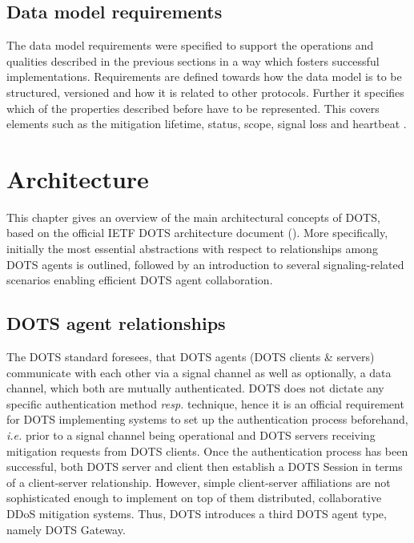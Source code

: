 \subsection{Data model requirements}
The data model requirements were specified to support the operations and qualities described in the previous sections in a way which fosters successful implementations.
Requirements are defined towards how the data model is to be structured, versioned and how it is related to other protocols. Further it specifies which of the properties described before have to be represented. This covers elements such as the mitigation lifetime, status, scope, signal loss and heartbeat \cite{rfc8612}.

\section{Architecture}


This chapter gives an overview of the main architectural concepts of DOTS, based on the official IETF DOTS architecture document (\cite{dots-architecture}). More specifically, initially the most essential abstractions with respect to relationships among DOTS agents is outlined, followed by an introduction to several signaling-related scenarios enabling efficient DOTS agent collaboration.

\subsection{DOTS agent relationships}
The DOTS standard foresees, that DOTS agents (DOTS clients \& servers) communicate with each other via a signal channel as well as optionally, a data channel, which both are mutually authenticated. DOTS does not dictate any specific authentication method \emph{resp.} technique, hence it is an official requirement for DOTS implementing systems to set up the authentication process beforehand, \emph{i.e.} prior to a signal channel being operational and DOTS servers receiving mitigation requests from DOTS clients. Once the authentication process has been successful, both DOTS server and client then establish a DOTS Session in terms of a client-server relationship. However, simple client-server affiliations are not sophisticated enough to implement on top of them distributed, collaborative DDoS mitigation systems. Thus, DOTS introduces a third DOTS agent type, namely DOTS Gateway.

